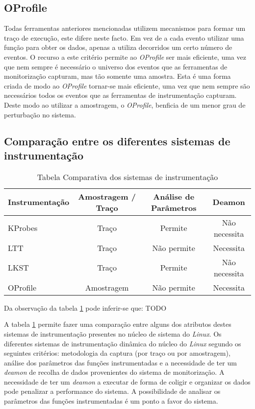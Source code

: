 \subsection{OProfile}\label{cap:Oprofile_overview}
Todas ferramentas anteriores mencionadas utilizem mecanismos para formar um traço de execução, este difere neste facto.
Em vez de a cada evento utilizar uma função para obter os dados, apenas a utiliza decorridos um certo número de eventos.
O recurso a este critério permite ao \textit{OProfile} ser mais eficiente, uma vez que nem sempre é necessário o universo dos eventos que as ferramentas de monitorização capturam, mas tão somente uma amostra.
Esta é uma forma criada de modo ao \textit{OProfile} tornar-se mais eficiente, uma vez que nem sempre são necessários todos os eventos que as ferramentas de instrumentação capturam.
Deste modo ao utilizar a amostragem, o \textit{OProfile}, benficia de um menor grau de perturbação no sistema\cite{Will:TuninProgrOProf}.


\subsection{Comparação entre os diferentes sistemas de instrumentação}
\begin{table}[h!]
\begin{center}
\caption{Tabela Comparativa dos sistemas de instrumentação}
\label{tab:inst_compare}
\begin{tabular}{|l||c|c|c|}
\hline
Instrumentação & Amostragem / Traço & Análise de Parâmetros & Deamon \\
\hline
KProbes & Traço & Permite & Não necessita \\
\hline
LTT & Traço & Não permite & Necessita \\
\hline
LKST & Traço & Permite & Não necessita \\
\hline
OProfile & Amostragem & Não permite & Necessita \\
\hline
\end{tabular}
\end{center}
\end{table}

Da observação da tabela \ref{tab:inst_compare} pode inferir-se que: TODO

A tabela \ref{tab:inst_compare} permite fazer uma comparação entre alguns dos atributos destes sistemas de instrumentação presentes no núcleo de sistema do \textit{Linux}.
Os diferentes sistemas de instrumentação dinâmica do núcleo do \textit{Linux} segundo os seguintes critérios: metodologia da captura (por traço ou por amostragem), análise dos parâmetros das funções instrumentadas e a necessidade de ter um \textit{deamon} de recolha de dados provenientes do sistema de monitorização.
A necessidade de ter um \textit{deamon} a executar de forma de coligir e organizar os dados pode penalizar a performance do sistema.
A possibilidade de analisar os parâmetros das funções instrumentadas é um ponto a favor do sistema. 

